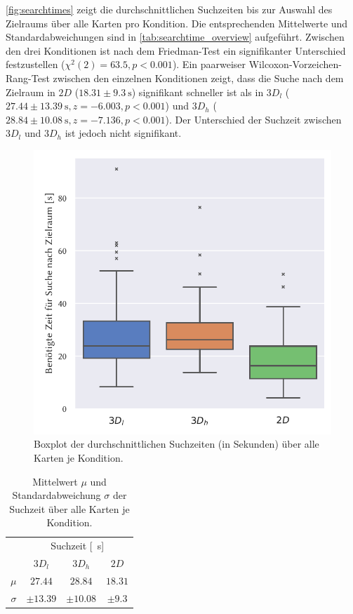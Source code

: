 \autoref{fig:searchtimes} zeigt die durchschnittlichen Suchzeiten bis zur Auswahl des Zielraums über alle Karten pro Kondition.
Die entsprechenden Mittelwerte und Standardabweichungen sind in \autoref{tab:searchtime_overview} aufgeführt.
Zwischen den drei Konditionen ist nach dem Friedman-Test ein signifikanter Unterschied festzustellen ($\chi^2(2) = \num{63.5}, p < 0.001$).
Ein paarweiser Wilcoxon-Vorzeichen-Rang-Test zwischen den einzelnen Konditionen zeigt, dass die Suche nach dem Zielraum in $2D$ ($\num{18.31} \pm \SI{9.3}{\second}$) signifikant schneller ist als in $3D_l$ ($\num{27.44} \pm \SI{13.39}{\second}, z=\num{-6.003}, p<\num{0.001}$) und $3D_h$ ($\num{28.84} \pm \SI{10.08}{\second}, z=\num{-7.136}, p<0.001$).
Der Unterschied der Suchzeit zwischen $3D_l$ und $3D_h$ ist jedoch nicht signifikant.
\begin{figure}[h!]
    \centering
    \includegraphics[width=0.7\linewidth]{figures/analysis/searchtime_boxplot}
    \caption{Boxplot der durchschnittlichen Suchzeiten (in Sekunden) über alle Karten je Kondition.}
    \label{fig:searchtimes}
\end{figure}

\begin{table}[h!]
    \centering
    \caption{Mittelwert $\mu$ und Standardabweichung $\sigma$ der Suchzeit über alle Karten je Kondition.}
    \label{tab:searchtime_overview}
    \begin{tabular}{rccc}
        \toprule
        {} & \multicolumn{3}{c}{Suchzeit [\SI{}{\second}]} \\
        {} &          $3D_l$ &          $3D_h$ &          $2D$ \\
        \midrule
        $\mu$    &  $\num{27.44}$     &  $\num{28.84}$     &  $\num{18.31}$ \\
        $\sigma$ &  $\pm \num{13.39}$ &  $\pm \num{10.08}$ &   $\pm \num{9.3}$ \\
        \bottomrule
    \end{tabular}
\end{table}

